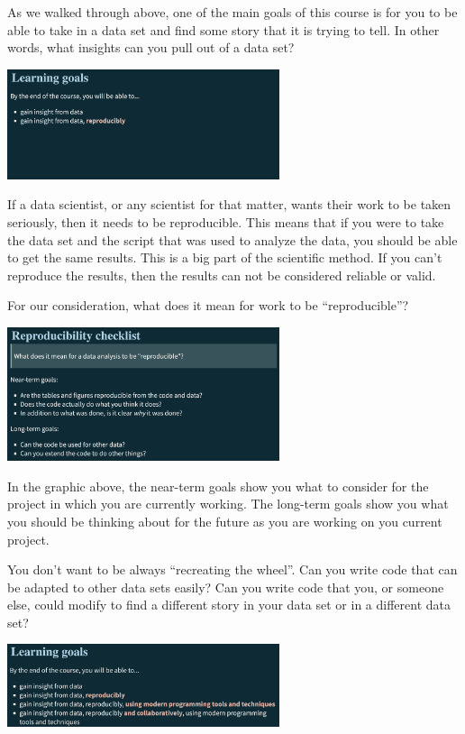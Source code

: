 \documentclass[
  letterpaper,
  DIV=11,
  numbers=noendperiod]{scrreprt}
\begin{document}
As we walked through above, one of the main goals of this course is for
you to be able to take in a data set and find some story that it is
trying to tell. In other words, what insights can you pull out of a data
set?

\includegraphics[width=0.6\textwidth,height=\textheight]{./images/WIDS-9.jpg}

If a data scientist, or any scientist for that matter, wants their work
to be taken seriously, then it needs to be reproducible. This means that
if you were to take the data set and the script that was used to analyze
the data, you should be able to get the same results. This is a big part
of the scientific method. If you can't reproduce the results, then the
results can not be considered reliable or valid.

For our consideration, what does it mean for work to be
``reproducible''?

\includegraphics[width=0.6\textwidth,height=\textheight]{./images/WIDS-10.jpg}

In the graphic above, the near-term goals show you what to consider for
the project in which you are currently working. The long-term goals show
you what you should be thinking about for the future as you are working
on you current project.

You don't want to be always ``recreating the wheel''. Can you write code
that can be adapted to other data sets easily? Can you write code that
you, or someone else, could modify to find a different story in your
data set or in a different data set?

\includegraphics[width=0.6\textwidth,height=\textheight]{./images/WIDS-12.jpg}
\end{document}
